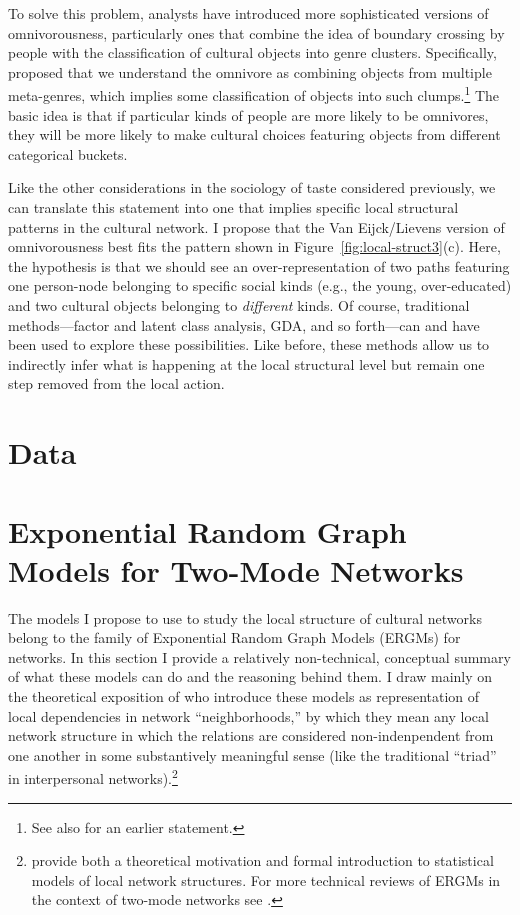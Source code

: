 \documentclass[preprint,12pt,authoryear]{elsarticle}
\begin{document}
To solve this problem, analysts have introduced more sophisticated versions of omnivorousness, particularly ones that combine the idea of boundary crossing by people with the classification of cultural objects into genre clusters. Specifically, \citet{van2008cultural} proposed that we understand the omnivore as combining objects from multiple meta-genres, which implies some classification of objects into such clumps.\footnote{See also \citet{van2001social} for an earlier statement.} The basic idea is that if particular kinds of people are more likely to be omnivores,  they will be more likely to make cultural choices featuring objects from different categorical buckets. 

Like the other considerations in the sociology of taste considered previously, we can translate this statement into one that implies specific local structural patterns in the cultural network. I propose that the Van Eijck/Lievens version of omnivorousness best fits the pattern shown in Figure~\ref{fig:local-struct3}(c). Here, the hypothesis is that we should see an over-representation of two paths featuring one person-node belonging to specific social kinds (e.g., the young, over-educated) and two cultural objects belonging to \textit{different} kinds. Of course, traditional methods---factor and latent class analysis, GDA, and so forth---can and have been used to explore these possibilities. Like before, these methods allow us to indirectly infer what is happening at the local structural level but remain one step removed from the local action. 

\section{Data}
\label{sec:data}
\section{Exponential Random Graph Models for Two-Mode Networks}
\label{sec:ermgs}
The models I propose to use to study the local structure of cultural networks belong to the family of Exponential Random Graph Models (ERGMs) for networks. In this section I provide a relatively non-technical, conceptual summary of what these models can do and the reasoning behind them. I draw mainly on the theoretical exposition of \citet{pattison2002neighborhood} who introduce these models as representation of local dependencies in network ``neighborhoods,'' by which they mean any local network structure in which the relations are considered non-indenpendent from one another in some substantively meaningful sense (like the traditional ``triad'' in interpersonal networks).\footnote{\citet{pattison2002neighborhood} provide both a theoretical motivation and formal introduction to statistical models of local network structures. For more technical reviews of ERGMs in the context of two-mode networks see \citet{wang2009exponential, wang2013exponential}.}
\end{document}

